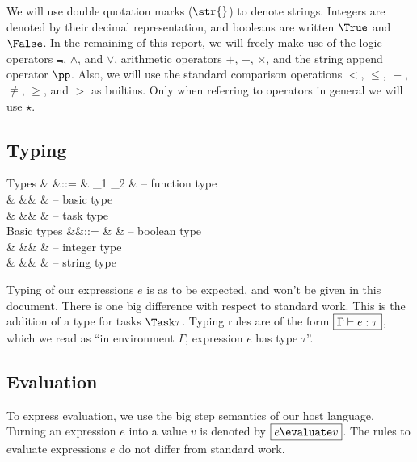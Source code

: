 We will use double quotation marks ($\str{}$) to denote strings.
Integers are denoted by their decimal representation,
and booleans are written $\True$ and $\False$.
In the remaining of this report,
we will freely make use of the logic operators $\Not$, $\land$, and $\lor$,
arithmetic operators $+$, $-$, $\times$,
and the string append operator $\pp$.
Also, we will use the standard comparison operations $<$, $\le$, $\equiv$, $\not\equiv$, $\ge$, and $>$
as builtins.
Only when referring to operators in general we will use $\star$.


\subsection{Typing}

\begin{grammar}
  Types
    & \tau &::= & \tau_1 \to \tau_2 & – function type \\
    &      &\mid& \beta             & – basic type \\
    &      &\mid& \Task \tau        & – task type \\
  Basic types
    &\beta &::= & \Bool             & – boolean type \\
    &      &\mid& \Int              & – integer type \\
    &      &\mid& \String           & – string type \\
\end{grammar}
Typing of our expressions $e$ is as to be expected,
and won't be given in this document.
There is one big difference with respect to standard work.
This is the addition of a type for tasks $\Task \tau$.
Typing rules are of the form $\boxed{\Gamma \vdash e : \tau}$,
which we read as \enquote{in environment $\Gamma$, expression $e$ has type $\tau$}.


\subsection{Evaluation}
\label{sec:evaluation}

To express evaluation,
we use the big step semantics of our host language.
Turning an expression $e$ into a value $v$ is denoted by $\boxed{e \evaluate v}$.
The rules to evaluate expressions $e$ do not differ from standard work.

